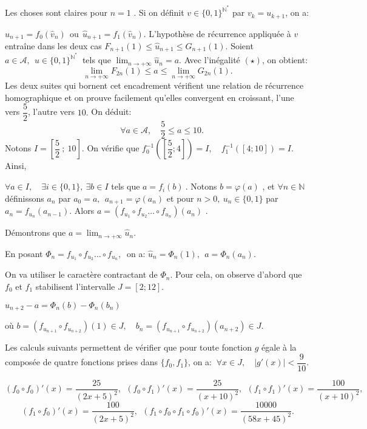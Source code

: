 Les choses sont claires pour $n=1$ .  Si on définit $v\in \{0,1\} ^{\mathbb N^*} $ par $v_k =u_{k+1}$, on a:   

$ \widehat u _{n+1}= f_0 (\widehat v _n)\:\:\text{ou} \:\: \widehat u_{n+1}= f_1 (\widehat v_n).$
L'hypothèse de récurrence appliquée à $v$ entraîne dans les deux cas  $F_{n+1}(1) \leqslant \widehat u _{n+1} \leqslant G_{n+1}(1).$ 
Soient $a\in \mathcal A,\:\: u \in\{0,1\} ^{\mathbb N^*}\:$ tels que $\displaystyle \lim_{n \to + \infty} \widehat u_n =a.$  Avec l'inégalité $(\star)$, on obtient: $$\displaystyle \lim_{n\to + \infty} F_{2n }(1) \leqslant a \leqslant\lim_ {n \to + \infty} G_{2n} (1).$$ 
Les deux suites qui bornent cet encadrement vérifient une relation de récurrence homographique et on prouve facilement qu'elles convergent  en croissant, l'une vers $ \dfrac 52$, l'autre vers $10.$ On déduit:
$$\quad \forall a \in \mathcal A,\quad\dfrac 52 \leqslant a \leqslant 10. $$ 
Notons $I=\left [ \dfrac 52\:;\: 10\right].$ On vérifie que $ f_0^{-1} \left( \left[ \dfrac 52 ; 4\right]\right) =I,\quad f_1^{-1} \left(\left[ 4 ; 10\right]\right) =I.$ Ainsi,

$\forall a \in I,\quad \exists i \in \{0,1\}, \:\exists b \in I $ tels que  $a = f_i (b)\:$. Notons $ b =\varphi (a)$ ,  et $\forall n \in \mathbb N $ définissons $a_n$ par
$a_0 = a , \:\: a_{n+1} = \varphi (a_n)$  et pour $n>0 ,\: u_n \in \{0,1\}$ par $a_n = f_{u_n} (a_{n-1})$. Alors  $a = \left (f_{u_1} \circ f_{u_2} \dots \circ f_{u_n} \right) (a_n)$ .

Démontrons que $\displaystyle  a=\lim_{n \to + \infty} \widehat u_n.$ 

En posant $\Phi _n = f_{u_1}\circ f_{u_2} \dots \circ f_{u_n},\:$ on a: $\widehat u_n = \Phi_n(1),\:\:a = \Phi _n (a_n).$ 

On va utiliser le caractère contractant de $\Phi_n$. 
Pour cela, on observe d'abord que $f_0$ et $f_1$ stabilisent l'intervalle $J=[2 ; 12].$   

$\widehat u_{n+2} -a = \Phi _n (b) - \Phi _n (b_n)\quad$ 

où $b =\left (f_{u_{n+1}} \circ f_{u_{n+2}}\right) (1) \in J,\quad  b_n =\left(f_{u_{n+1}} \circ f_{u_{n+2}} \right) (a_{n+2} )\in J.$ 

Les calculs suivants permettent de vérifier que pour toute fonction $g$ égale à la composée de quatre fonctions prises dans $\{f_0 , f_1\} $, on a: $\:\forall x \in J, \quad | g'(x) | < \dfrac 9{10} $.  
 
    $$(f_0 \circ f_0)'(x)=\dfrac {25}{(2x +5)^2},\:\: ( f_0 \circ f_1)'(x) = \dfrac {25}{(x+10)^2},\:\: ( f_1 \circ f_1)'(x) = \dfrac {100}{(x+10)^2},\: \:$$  
    $$(f_1\circ f_0)'(x) = \dfrac {100}{(2x+5)^2},\:\: 
    (f_1 \circ f_0\circ f_1 \circ f_0)'(x) = \dfrac {10000}{(58x+45)^2}.$$ 
  
